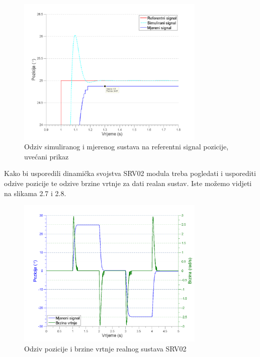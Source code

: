 \documentclass[12pt,a4paper]{article}
\begin{document}
\begin{figure}[h]
	\begin{center}
	\includegraphics[width=0.8\textwidth] {odziv_ref_sim_real_closer.png}
    \caption{Odziv simuliranog i mjerenog sustava na referentni signal pozicije, uvećani prikaz}
    \end{center}
\end{figure}

Kako bi usporedili dinamička svojstva SRV02 modula treba pogledati i usporediti odzive pozicije te odzive brzine vrtnje za dati realan sustav. Iste možemo vidjeti na slikama 2.7 i 2.8.

\newpage

\begin{figure}[ht!]
	\begin{center}
	\includegraphics[width=0.8\textwidth] {odziv_spd_pos.png}
    \caption{Odziv pozicije i brzine vrtnje realnog sustava SRV02}
    \end{center}
\end{figure}
\end{document}
